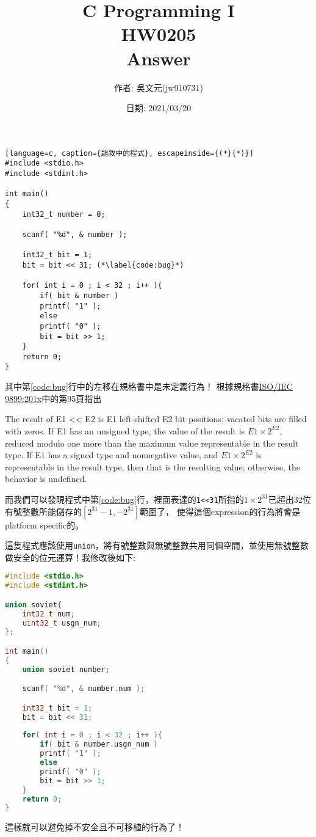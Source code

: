 \documentclass[a4paper,10pt]{article}
\title{C Programming I\\HW0205\\Answer}
\author{作者: 吳文元(jw910731)}
\date{日期: 2021/03/20}
\begin{document}
\maketitle
\begin{lstlisting}[language=c, caption={題敘中的程式}, escapeinside={(*}{*)}]
#include <stdio.h>
#include <stdint.h>

int main()
{
    int32_t number = 0;

    scanf( "%d", & number );

    int32_t bit = 1;
    bit = bit << 31; (*\label{code:bug}*)
    
    for( int i = 0 ; i < 32 ; i++ ){
        if( bit & number )
        printf( "1" );
        else
        printf( "0" );
        bit = bit >> 1;
    }
    return 0;
}
\end{lstlisting}
其中第\ref{code:bug}行中的左移在規格書中是未定義行為！
根據規格書\href{https://drive.google.com/file/d/1BGSbEazY5azERlFtP9DfmTTHgj-0AjY7/view}{ISO/IEC 9899:201x}中的第95頁指出
\begin{displayquote}
The result of E1 << E2 is E1 left-shifted E2 bit positions; vacated bits are filled with
zeros. If E1 has an unsigned type, the value of the result is \(E1 × 2^{E2}\), reduced modulo
one more than the maximum value representable in the result type. If E1 has a signed
type and nonnegative value, and \(E1 × 2^{E2}\) is representable in the result type, then that is
the resulting value; otherwise, the behavior is undefined.
\end{displayquote}
而我們可以發現程式中第\ref{code:bug}行，裡面表達的\lstinline{1<<31}所指的\(1\times 2^{31}\)已超出32位有號整數所能儲存的\([2^{31}-1, -2^{31}]\)範圍了，
使得這個expression的行為將會是platform specific的。

這隻程式應該使用\lstinline{union}，將有號整數與無號整數共用同個空間，並使用無號整數做安全的位元運算！我修改後如下:

\begin{lstlisting}[language=c, caption={修改後的的程式}]
#include <stdio.h>
#include <stdint.h>

union soviet{
    int32_t num;
    uint32_t usgn_num;
};

int main()
{
    union soviet number;

    scanf( "%d", & number.num );

    int32_t bit = 1;
    bit = bit << 31;
    
    for( int i = 0 ; i < 32 ; i++ ){
        if( bit & number.usgn_num )
        printf( "1" );
        else
        printf( "0" );
        bit = bit >> 1;
    }
    return 0;
}
\end{lstlisting}
這樣就可以避免掉不安全且不可移植的行為了！
\end{document}
